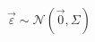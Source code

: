 \documentclass[preview]{standalone}
\begin{document}
\begin{align*}
\vec{\varepsilon} \sim \mathcal{N}(\vec{0}, \Sigma)
\end{align*}
\end{document}
